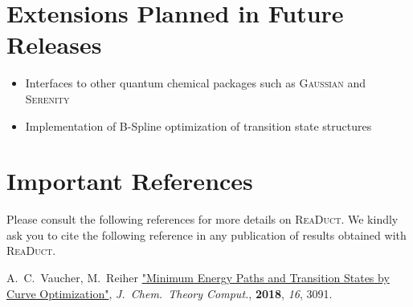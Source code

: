\documentclass[]{tufte-book}
\begin{document}
\chapter{Extensions Planned in Future Releases}
\begin{itemize}
\item Interfaces to other quantum chemical packages such as \textsc{Gaussian} and \textsc{Serenity}\cite{serenity}
\item Implementation of B-Spline optimization of transition state structures\cite{bsplines}
\end{itemize}


\chapter{Important References}

Please consult the following references for more details on \textsc{ReaDuct}.
We kindly ask you to cite the following reference in any publication of results obtained with \textsc{ReaDuct}.
\vspace{1.0cm}

A.~C.~Vaucher, M.~Reiher \href{https://pubs.acs.org/doi/10.1021/acs.jctc.8b00169}{"Minimum Energy Paths and Transition States by Curve Optimization"}, \textit{J.~Chem.~Theory Comput.}, \textbf{2018}, \textit{16}, 3091.




\backmatter




\end{document}
